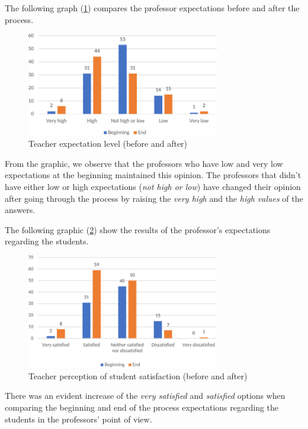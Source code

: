 \documentclass{textolivre}
\begin{document}
The following graph (\ref{fig3}) compares the professor expectations before and after the process.

\begin{figure}[htbp]
 \centering
 \includegraphics[width=0.75\textwidth]{Fig_003.pdf}
 \caption{Teacher expectation level (before and after)}
 \label{fig3}
\end{figure}

From the graphic, we observe that the professors who have low and very low expectations at the beginning maintained this opinion. The professors that didn't have either low or high expectations (\emph{not high or low}) have changed their opinion after going through the process by raising the \emph{very high} and the \emph{high values} of the answers. 

The following graphic (\ref{fig4}) show the results of the professor's expectations regarding the students.

\begin{figure}[htbp]
 \centering
 \includegraphics[width=0.75\textwidth]{Fig_004.pdf}
 \caption{Teacher perception of student satisfaction (before and after)}
 \label{fig4}
\end{figure}

There was an evident increase of the \emph{very satisfied} and \emph{satisfied} options when comparing the beginning and end of the process expectations regarding the students in the professors' point of view. 
\end{document}

